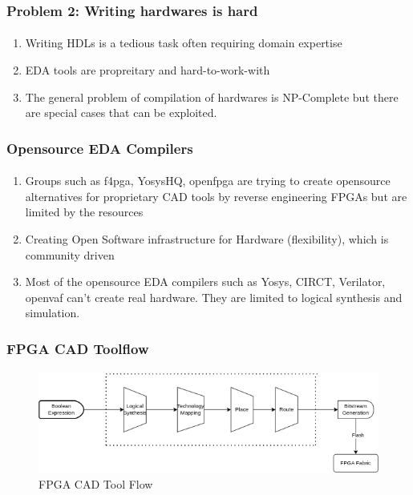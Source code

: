 \documentclass{beamer}
\begin{document}
\begin{frame}[fragile]
  \frametitle{Problem 2: Writing hardwares is hard}
  \framesubtitle{}
  \begin{enumerate}
    \item Writing HDLs is a tedious task often requiring domain expertise
    \item EDA tools are propreitary and hard-to-work-with
    \item The general problem of compilation of hardwares is NP-Complete but
      there are special cases that can be exploited.
  \end{enumerate}
\end{frame}


\begin{frame}[fragile]
  \frametitle{Opensource EDA Compilers}
  \framesubtitle{}
  \begin{enumerate}
    \item Groups such as f4pga, YosysHQ, openfpga are trying to create opensource
      alternatives for proprietary CAD tools by reverse engineering FPGAs
      but are limited by the resources 
    \item Creating Open Software infrastructure for Hardware (flexibility),
      which is community driven 
    \item Most of the opensource EDA compilers such as Yosys, CIRCT, Verilator,
      openvaf can't create real hardware. They are limited to
      logical synthesis and simulation.
  \end{enumerate}

\end{frame}

\begin{frame}[fragile]
  \frametitle{FPGA CAD Toolflow}
  \framesubtitle{}
   \begin{figure}
        \centering
        \includegraphics[width=1\linewidth]{images/cad_flow_fl.png}
        \caption{FPGA CAD Tool Flow }
        \label{exa_cadflow}
    \end{figure}
   
\end{frame}
\end{document}
